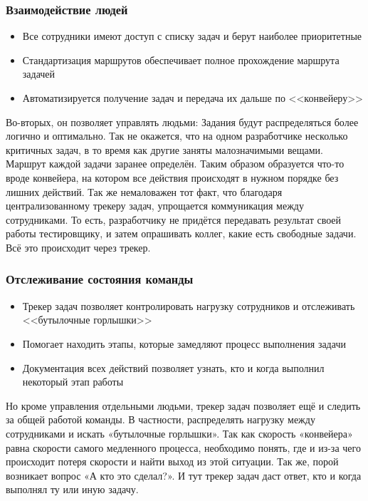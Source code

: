 \documentclass{../industrial-development}
\begin{document}
\begin{frame} \frametitle{Взаимодействие людей}
	\begin{itemize}
		\item Все сотрудники имеют доступ с списку задач и берут наиболее приоритетные
		\item Стандартизация маршрутов обеспечивает полное прохождение маршрута задачей
		\item Автоматизируется получение задач и передача их дальше по <<конвейеру>>
	\end{itemize}
\end{frame}

\lecturenotes
Во-вторых, он позволяет управлять людьми:
Задания будут распределяться более логично и оптимально. Так не окажется, что на одном разработчике несколько критичных задач, в то время как другие заняты малозначимыми вещами.
Маршрут каждой задачи заранее определён. Таким образом образуется что-то вроде конвейера, на котором все действия происходят в нужном порядке без лишних действий.
Так же немаловажен тот факт, что благодаря централизованному трекеру задач, упрощается коммуникация между сотрудниками. То есть, разработчику не придётся передавать результат своей работы тестировщику, и затем опрашивать коллег, какие есть свободные задачи. Всё это происходит через трекер.

\begin{frame} \frametitle{Отслеживание состояния команды}
	\begin{itemize}
		\item Трекер задач позволяет контролировать нагрузку сотрудников и отслеживать <<бутылочные горлышки>>
		\item Помогает находить этапы, которые замедляют процесс выполнения задачи
		\item Документация всех действий позволяет узнать, кто и когда выполнил некоторый этап работы
	\end{itemize}
\end{frame}

\lecturenotes
Но кроме управления отдельными людьми, трекер задач позволяет ещё и следить за общей работой команды. В частности, распределять нагрузку между сотрудниками и искать «бутылочные горлышки». Так как скорость «конвейера» равна скорости самого медленного процесса, необходимо понять, где и из-за чего происходит потеря скорости и найти выход из этой ситуации.
Так же, порой возникает вопрос «А кто это сделал?». И тут трекер задач даст ответ, кто и когда выполнял ту или иную задачу.
\end{document}
